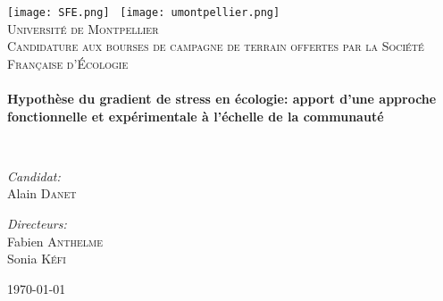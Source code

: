 \begin{titlepage}
\begin{center}

\texttt{[image: SFE.png]}~ \hfill \texttt{[image: umontpellier.png]}~\\[1cm]

\textsc{\LARGE Université de Montpellier}\\[1.5cm]

\textsc{\large Candidature aux bourses de campagne de terrain offertes par la 
Société Française d'Écologie}\\[0.5cm]

\HRule \\[0.4cm]
{ \Large \bfseries  Hypothèse du gradient de stress en écologie: apport d'une approche fonctionnelle et expérimentale à l'échelle de la communauté \\[0.4cm] }

\HRule \\[1.5cm]

\noindent
\begin{minipage}{0.4\textwidth}
\begin{flushleft} \large
\emph{Candidat:}\\
Alain \textsc{Danet}
\end{flushleft}
\end{minipage}%
\begin{minipage}{0.4\textwidth}
\begin{flushright} \large
\emph{Directeurs:} \\
Fabien \textsc{Anthelme} \\[0.01cm]
Sonia \textsc{Kéfi}
\end{flushright}
\end{minipage}

\vfill

{\large \today}

\end{center}
\end{titlepage}